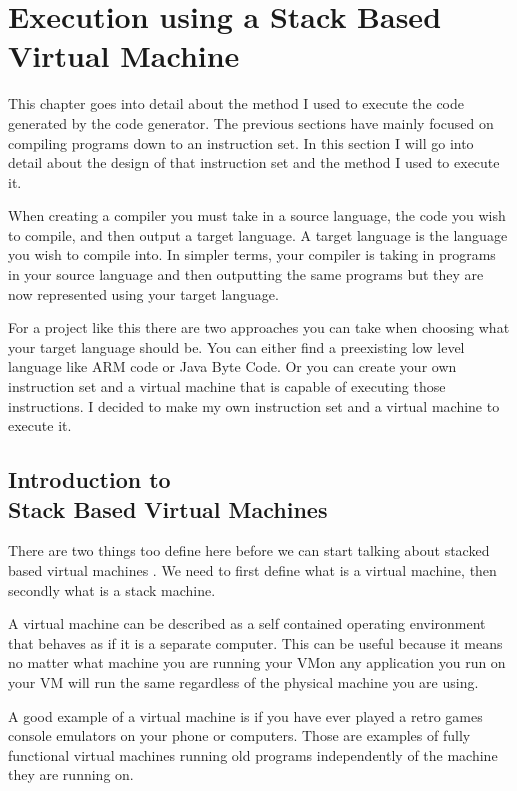
\chapter{Execution using a Stack Based Virtual Machine}

This chapter goes into detail about the method I used to execute the code generated by the code generator. The previous sections have mainly focused on compiling programs down to an instruction set. In this section I will go into detail about the design of that instruction set and the method I used to execute it.

When creating a compiler you must take in a source language, the code you wish to compile, and then output a target language. A target language is the language you wish to compile into. In simpler terms, your compiler is taking in programs in your source language and then outputting the same programs but they are now represented using your target language.    

For a project like this there are two approaches you can take when choosing what your target language should be. You can either find a preexisting low level language like ARM code or Java Byte Code. Or you can create your own instruction set and a virtual machine that is capable of executing those instructions. I decided to make my own instruction set and a virtual machine to execute it. 


\section[Introduction to Stack Based Virtual Machines]{Introduction to \\ Stack Based Virtual Machines}

There are two things too define here before we can start talking about stacked based virtual machines . We need to first define what is a virtual machine, then secondly what is a stack machine. 

A virtual machine can be described as a self contained operating environment that behaves as if it is a separate computer\footnotemark[1] . This can be useful because it means no matter what machine you are running your VM\footnotemark[2] on any application you run on your VM will run the same regardless of the physical machine you are using.


A good example of a virtual machine is if you have ever played a retro games console emulators on your phone or computers. Those are examples of fully functional virtual machines running old programs independently of the machine they are running on. 

